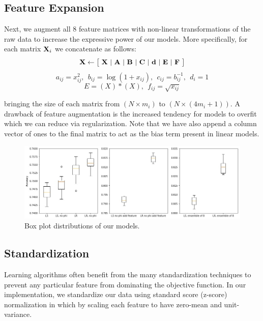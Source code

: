 \documentclass[10pt,conference,compsocconf]{IEEEtran}
\begin{document}
\subsection{Feature Expansion}
Next, we augment all 8 feature matrices with non-linear transformations of the raw data to increase the expressive power of our models. More specifically, for each matrix ${\textbf X_i}$ we concatenate as follows:
\vspace*{-1mm}
\begin{equation}
{\textbf X} \leftarrow \big[ \ {\textbf X} \ \vert \ {\textbf A} \ \vert \ {\textbf B} \ \vert \ {\textbf C} \ \vert \ {\textbf d} \ \vert \ {\textbf E} \ \vert \ {\textbf F} \ \big]
\end{equation}
\vspace*{-5mm}
\begin{equation}
a_{ij} = x_{ij}^2, \ \ b_{ij} = \log (1 + x_{ij}), \ \ c_{ij} = b_{ij}^{-1}, \ \ d_{i} = 1 
\end{equation}
\vspace*{-5mm}
\begin{equation}
E = (X)*(X), \ \ f_{ij} = \sqrt{x_{ij}}
\end{equation}

bringing the size of each matrix from $ (N \times m_i) $ to $ (N \times (4m_i + 1))$. A drawback of feature augmentation is the increased tendency for models to overfit which we can reduce via regularization. Note that we have also append a column vector of ones to the final matrix to act as the bias term present in linear models. 

\begin{figure}[t]
\begin{center}
  \includegraphics[width=\textwidth]{box1.jpg}
  \caption{Box plot distributions of our models.}
\end{center}
   \label{fig:boxplot}
\end{figure}

\subsection{Standardization}
Learning algorithms often benefit from the many standardization techniques to prevent any particular feature from dominating the objective function. In our implementation, we standardize our data using standard score (z-score) normalization in which by scaling each feature to have zero-mean and unit-variance.
\end{document}
